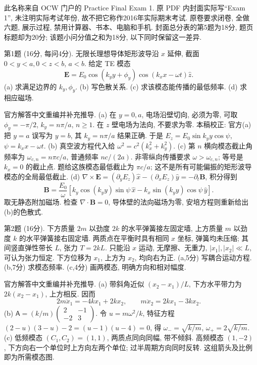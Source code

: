 此名称来自 OCW 门户的 Practice Final Exam 1. 原 PDF 内封面实际写``Exam 1'', 未注明实际考试年份, 故不把它称作2016年实际期末考试. 原卷要求闭卷, 全做六题, 展示过程, 禁用计算器、书本、电脑和手机. 封面总分表的第5题为18分, 题页标题却为20分; 该题小问分值之和为18分, 以下同时保留这一差异.
\begin{exercise}\label{exam:f1.1}
第1题 (16分, 每问4分). 无限长理想导体矩形波导沿 $x$ 延伸, 截面 $0<y<a,0<z<b$, $a<b$. 给定 TE 模态
\[
\boldsymbol E=E_0\cos(k_yy+\phi_y)\cos(k_xx-\omega t)\hat z.
\]
(a) 求满足边界的 $k_y,\phi_y$. (b) 写色散关系. (c) 求该模态能传播的最低频率. (d) 求相应磁场.
\end{exercise}
\begin{solution}
官方解答中文重编并补充推导. (a) 在 $y=0,a$, 电场沿壁切向, 必须为零, 可取 $\phi_y=-\pi/2$, $k_y=n\pi/a$, $n\ge1$. 在 $z$ 壁电场为法向, 不要求为零. 本稿校正: 官方(a)把 $y=a$ 误写为 $y=b$, 其 $k_y=n\pi/a$ 结果正确. 于是 $E_z=E_0\sin k_yy\cos\psi$, $\psi=k_xx-\omega t$.
(b) 真空波方程代入给 $\omega^2=c^2(k_x^2+k_y^2)$.
(c) 第 $n$ 横向模态截止角频率为 $\omega_{c,n}=n\pi c/a$, 普通频率 $nc/(2a)$. 非零纵向传播要求 $\omega>\omega_{c,n}$; 等号是 $k_x=0$ 的截止点. 题给这族模态最低截止为 $\pi c/a$; 这不是所有可能偏振的矩形波导模态的全局最低截止.
(d) $\nabla\times\boldsymbol E=(\partial_yE_z)\hat x-(\partial_xE_z)\hat y=-\partial_t\boldsymbol B$, 积分得到
\[
\boldsymbol B=\frac{E_0}{\omega}\left[k_y\cos(k_yy)\sin\psi\,\hat x-k_x\sin(k_yy)\cos\psi\,\hat y\right].
\]
取无静态附加磁场. 检查 $\nabla\cdot\boldsymbol B=0$, 导体壁的法向磁场为零, 安培方程则重新给出(b)的色散式.
\end{solution}
\begin{exercise}\label{exam:f1.2}
第2题 (16分). 下方质量 $2m$ 以劲度 $2k$ 的水平弹簧接左固定墙, 上方质量 $m$ 以劲度 $k$ 的水平弹簧接右固定墙. 两质点在平衡时具有相同 $x$ 坐标, 弹簧均未压缩; 其间竖直弹性带长 $L$, 张力 $T=2kL$. 只能沿 $x$ 运动, 无摩擦、无重力, $|x_1|,|x_2|\ll L$, 可认为张力恒定. 下方位移为 $x_1$, 上方为 $x_2$, 均向右为正. (a,5分) 写耦合运动方程. (b,7分) 求模态频率. (c,4分) 画两模态, 明确方向和相对幅度.
\end{exercise}
\begin{solution}
官方解答中文重编并补充推导. (a) 带斜角近似 $(x_2-x_1)/L$, 下方水平带力为 $2k(x_2-x_1)$, 上方相反. 因而
\[
2m\ddot x_1=-4kx_1+2kx_2,\qquad m\ddot x_2=2kx_1-3kx_2.
\]
(b) $\mathsf A=(k/m)\begin{pmatrix}2&-1\\-2&3\end{pmatrix}$. 令 $u=m\omega^2/k$, 特征方程 $(2-u)(3-u)-2=(u-1)(u-4)=0$, 得 $\omega_- =\sqrt{k/m}$, $\omega_+=2\sqrt{k/m}$.
(c) 低频模态 $(C_1,C_2)=(1,1)$, 两质点同向同幅, 带不倾斜. 高频模态 $(1,-2)$, 下方向右一个单位时上方向左两个单位; 过半周期方向同时反转. 这组箭头及比例即为所需模态图.
\end{solution}
